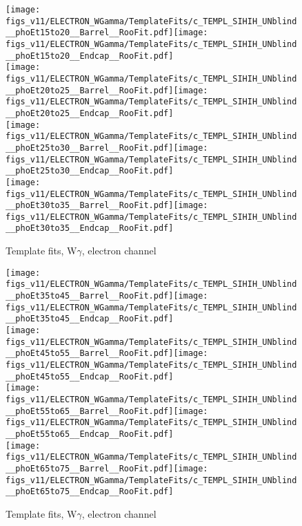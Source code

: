 \begin{figure}[htb]
  \begin{center}
   \texttt{[image: figs\_v11/ELECTRON\_WGamma/TemplateFits/c\_TEMPL\_SIHIH\_UNblind\_\_phoEt15to20\_\_Barrel\_\_RooFit.pdf]}\texttt{[image: figs\_v11/ELECTRON\_WGamma/TemplateFits/c\_TEMPL\_SIHIH\_UNblind\_\_phoEt15to20\_\_Endcap\_\_RooFit.pdf]}\\
   \texttt{[image: figs\_v11/ELECTRON\_WGamma/TemplateFits/c\_TEMPL\_SIHIH\_UNblind\_\_phoEt20to25\_\_Barrel\_\_RooFit.pdf]}\texttt{[image: figs\_v11/ELECTRON\_WGamma/TemplateFits/c\_TEMPL\_SIHIH\_UNblind\_\_phoEt20to25\_\_Endcap\_\_RooFit.pdf]}\\
   \texttt{[image: figs\_v11/ELECTRON\_WGamma/TemplateFits/c\_TEMPL\_SIHIH\_UNblind\_\_phoEt25to30\_\_Barrel\_\_RooFit.pdf]}\texttt{[image: figs\_v11/ELECTRON\_WGamma/TemplateFits/c\_TEMPL\_SIHIH\_UNblind\_\_phoEt25to30\_\_Endcap\_\_RooFit.pdf]}\\
   \texttt{[image: figs\_v11/ELECTRON\_WGamma/TemplateFits/c\_TEMPL\_SIHIH\_UNblind\_\_phoEt30to35\_\_Barrel\_\_RooFit.pdf]}\texttt{[image: figs\_v11/ELECTRON\_WGamma/TemplateFits/c\_TEMPL\_SIHIH\_UNblind\_\_phoEt30to35\_\_Endcap\_\_RooFit.pdf]}\\
  \label{fig:templateFits_SIHIH_ELECTRON_1}
  \caption{Template fits, W$\gamma$, electron channel}
  \end{center}
\end{figure}

\begin{figure}[htb]
  \begin{center}
   \texttt{[image: figs\_v11/ELECTRON\_WGamma/TemplateFits/c\_TEMPL\_SIHIH\_UNblind\_\_phoEt35to45\_\_Barrel\_\_RooFit.pdf]}\texttt{[image: figs\_v11/ELECTRON\_WGamma/TemplateFits/c\_TEMPL\_SIHIH\_UNblind\_\_phoEt35to45\_\_Endcap\_\_RooFit.pdf]}\\
   \texttt{[image: figs\_v11/ELECTRON\_WGamma/TemplateFits/c\_TEMPL\_SIHIH\_UNblind\_\_phoEt45to55\_\_Barrel\_\_RooFit.pdf]}\texttt{[image: figs\_v11/ELECTRON\_WGamma/TemplateFits/c\_TEMPL\_SIHIH\_UNblind\_\_phoEt45to55\_\_Endcap\_\_RooFit.pdf]}\\
   \texttt{[image: figs\_v11/ELECTRON\_WGamma/TemplateFits/c\_TEMPL\_SIHIH\_UNblind\_\_phoEt55to65\_\_Barrel\_\_RooFit.pdf]}\texttt{[image: figs\_v11/ELECTRON\_WGamma/TemplateFits/c\_TEMPL\_SIHIH\_UNblind\_\_phoEt55to65\_\_Endcap\_\_RooFit.pdf]}\\
   \texttt{[image: figs\_v11/ELECTRON\_WGamma/TemplateFits/c\_TEMPL\_SIHIH\_UNblind\_\_phoEt65to75\_\_Barrel\_\_RooFit.pdf]}\texttt{[image: figs\_v11/ELECTRON\_WGamma/TemplateFits/c\_TEMPL\_SIHIH\_UNblind\_\_phoEt65to75\_\_Endcap\_\_RooFit.pdf]}\\
  \label{fig:templateFits_SIHIH_ELECTRON_2}
  \caption{Template fits, W$\gamma$, electron channel}
  \end{center}
\end{figure}

